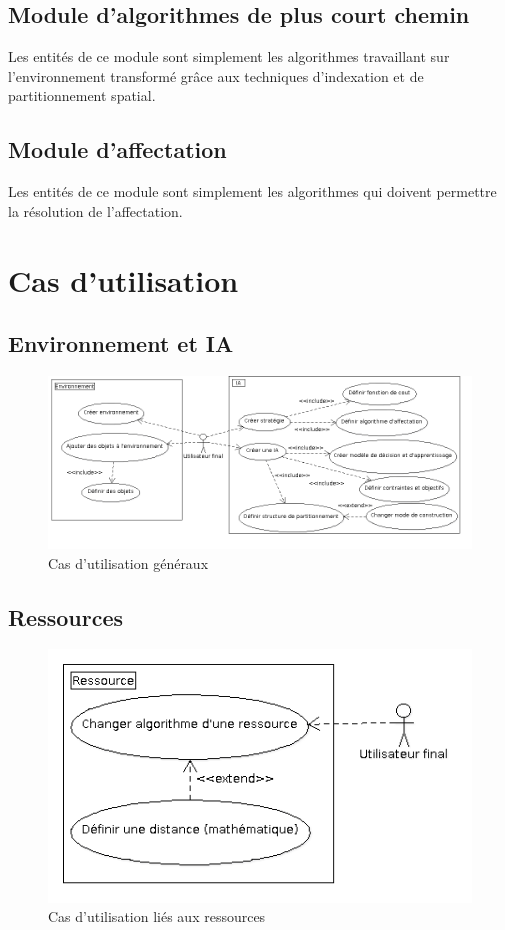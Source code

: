 %
\subsection{Module d'algorithmes de plus court chemin}

Les entités de ce module sont simplement les algorithmes travaillant sur l'environnement transformé grâce aux techniques d'indexation et de partitionnement spatial.

%
\subsection{Module d'affectation}

Les entités de ce module sont simplement les algorithmes qui doivent permettre la résolution de l'affectation. 


%
\newpage
\section{Cas d'utilisation}

\subsection{Environnement et IA}
\begin{figure}[!h]\centering
   \includegraphics[scale=0.5]{images/uc_main.png}
   \caption{\label{uc_main} Cas d'utilisation généraux}
\end{figure}
\subsection{Ressources}
\begin{figure}[!h]\centering
   \includegraphics[scale=0.5]{images/uc_ressource.png}
   \caption{\label{uc_main} Cas d'utilisation liés aux ressources}
\end{figure}
